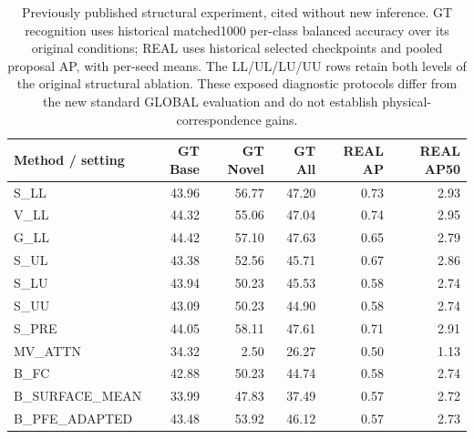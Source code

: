 \begin{table}[t]
\centering
\small
\caption{Previously published structural experiment, cited without new inference. GT recognition uses historical matched1000 per-class balanced accuracy over its original conditions; REAL uses historical selected checkpoints and pooled proposal AP, with per-seed means. The LL/UL/LU/UU rows retain both levels of the original structural ablation. These exposed diagnostic protocols differ from the new standard GLOBAL evaluation and do not establish physical-correspondence gains.}
\label{tab:benchmark-s4}
\begin{tabular}{lrrrrr}
\toprule
Method / setting & GT Base & GT Novel & GT All & REAL AP & REAL AP50 \\
\midrule
S\_LL & 43.96 & 56.77 & 47.20 & 0.73 & 2.93 \\
V\_LL & 44.32 & 55.06 & 47.04 & 0.74 & 2.95 \\
G\_LL & 44.42 & 57.10 & 47.63 & 0.65 & 2.79 \\
S\_UL & 43.38 & 52.56 & 45.71 & 0.67 & 2.86 \\
S\_LU & 43.94 & 50.23 & 45.53 & 0.58 & 2.74 \\
S\_UU & 43.09 & 50.23 & 44.90 & 0.58 & 2.74 \\
S\_PRE & 44.05 & 58.11 & 47.61 & 0.71 & 2.91 \\
MV\_ATTN & 34.32 & 2.50 & 26.27 & 0.50 & 1.13 \\
B\_FC & 42.88 & 50.23 & 44.74 & 0.58 & 2.74 \\
B\_SURFACE\_MEAN & 33.99 & 47.83 & 37.49 & 0.57 & 2.72 \\
B\_PFE\_ADAPTED & 43.48 & 53.92 & 46.12 & 0.57 & 2.73 \\
\bottomrule
\end{tabular}
\end{table}
